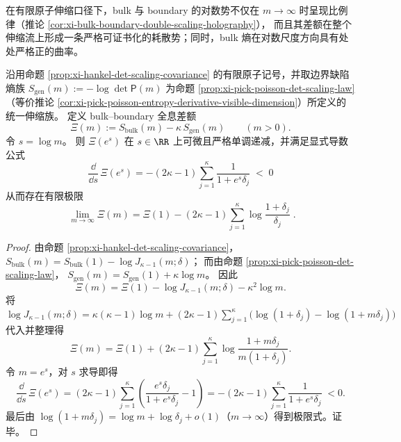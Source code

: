 
在有限原子伸缩口径下，bulk 与 boundary 的对数势不仅在 \(m\to\infty\) 时呈现比例律（推论 \ref{cor:xi-bulk-boundary-double-scaling-holography}），
而且其差额在整个伸缩流上形成一条严格可证书化的耗散势；同时，bulk 熵在对数尺度方向具有处处严格正的曲率。

\begin{corollary}\label{cor:xi-bulk-boundary-holographic-gap-dissipation}
沿用命题 \ref{prop:xi-hankel-det-scaling-covariance} 的有限原子记号，并取边界缺陷熵族
\(
S_{\mathrm{gen}}(m):=-\log\det\mathsf P(m)
\)
为命题 \ref{prop:xi-pick-poisson-det-scaling-law}（等价推论 \ref{cor:xi-pick-poisson-entropy-derivative-visible-dimension}）所定义的统一伸缩族。
定义 bulk--boundary 全息差额
\[
\Xi(m):=S_{\mathrm{bulk}}(m)-\kappa\,S_{\mathrm{gen}}(m)\qquad(m>0).
\]
令 \(s=\log m\)。
则 \(\Xi(e^s)\) 在 \(s\in\RR\) 上可微且严格单调递减，并满足显式导数公式
\[
\boxed{\;
\frac{\dd}{\dd s}\,\Xi(e^s)
=-(2\kappa-1)\sum_{j=1}^{\kappa}\frac{1}{1+e^s\delta_j}\;<\;0\;}
\]
从而存在有限极限
\[
\boxed{\;
\lim_{m\to\infty}\Xi(m)
=\Xi(1)-(2\kappa-1)\sum_{j=1}^{\kappa}\log\frac{1+\delta_j}{\delta_j}\; }.
\]
\end{corollary}
\begin{proof}
由命题 \ref{prop:xi-hankel-det-scaling-covariance}，
\(
S_{\mathrm{bulk}}(m)=S_{\mathrm{bulk}}(1)-\log J_{\kappa-1}(m;\delta)
\)；
而由命题 \ref{prop:xi-pick-poisson-det-scaling-law}，
\(
S_{\mathrm{gen}}(m)=S_{\mathrm{gen}}(1)+\kappa\log m
\)。
因此
\[
\Xi(m)
=\Xi(1)-\log J_{\kappa-1}(m;\delta)-\kappa^2\log m.
\]
将
\(
\log J_{\kappa-1}(m;\delta)
=\kappa(\kappa-1)\log m+(2\kappa-1)\sum_{j=1}^{\kappa}\bigl(\log(1+\delta_j)-\log(1+m\delta_j)\bigr)
\)
代入并整理得
\[
\Xi(m)=\Xi(1)+(2\kappa-1)\sum_{j=1}^{\kappa}\log\frac{1+m\delta_j}{m(1+\delta_j)}.
\]
令 \(m=e^s\)，对 \(s\) 求导即得
\[
\frac{\dd}{\dd s}\,\Xi(e^s)
=(2\kappa-1)\sum_{j=1}^{\kappa}\left(\frac{e^s\delta_j}{1+e^s\delta_j}-1\right)
=-(2\kappa-1)\sum_{j=1}^{\kappa}\frac{1}{1+e^s\delta_j}\;<0.
\]
最后由 \(\log(1+m\delta_j)=\log m+\log\delta_j+o(1)\)（\(m\to\infty\)）得到极限式。证毕。
\end{proof}

